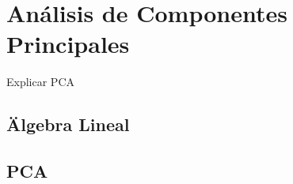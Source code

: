 \chapter{Análisis de Componentes Principales}

\noindent Explicar PCA

\newpage

\section{Älgebra Lineal}

\section{PCA}
